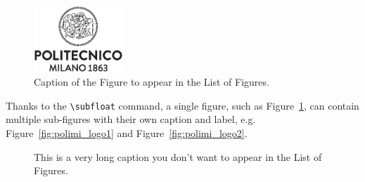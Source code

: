 \documentclass{Configuration_Files/PoliMi3i_thesis}
\begin{document}
\begin{figure}[H]
    \centering
    \includegraphics[width=0.3\textwidth]{logo_polimi_scritta.eps}
    \caption{Caption of the Figure to appear in the List of Figures.}
    \label{fig:quadtree}
\end{figure}

Thanks to the \texttt{\textbackslash subfloat} command, a single figure, such as Figure~\ref{fig:quadtree},
can contain multiple sub-figures with their own caption and label, e.g. \color{black} Figure~\ref{fig:polimi_logo1} and Figure~\ref{fig:polimi_logo2}. 

\begin{figure}[H]
    \centering
    \quad
    \caption[Shorter caption]{This is a very long caption you don't want to appear in the List of Figures.}
    \label{fig:quadtree2}
\end{figure}
\end{document}

